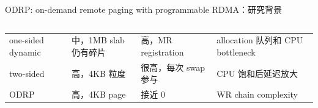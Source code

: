 \begin{frame}[t,shrink=6]{ODRP: on-demand remote paging with programmable RDMA：研究背景}
\begin{columns}[T,totalwidth=\textwidth]
\begin{column}{0.49\textwidth}
{\begin{minipage}[t]{0.97\linewidth}
\begin{minipage}{0.92\linewidth}
{\begin{tabularx}{\linewidth}{@{}YYYY@{}}
one-sided dynamic & 中，1MB slab 仍有碎片 & 高，MR registration & allocation 队列和 CPU bottleneck \\
two-sided & 高，4KB 粒度 & 很高，每次 swap 参与 & CPU 饱和后延迟放大 \\
ODRP & 高，4KB page & 接近 0 & WR chain complexity \\
\bottomrule
\end{tabularx}
}
    \end{minipage}
    \vspace{1mm}
  \end{minipage}}
  \end{column}
\end{columns}
\end{frame}


